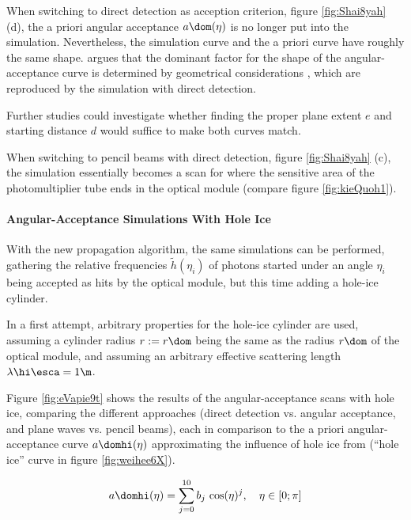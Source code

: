 
When switching to direct detection as acception criterion, figure \ref{fig:Shai8yah} (d), the a priori angular acceptance $a\dom(\eta)$ is no longer put into the simulation. Nevertheless, the simulation curve and the a priori curve have roughly the same shape.  argues that the dominant factor for the shape of the angular-acceptance curve is determined by geometrical considerations \cite{martindardupdate}, which are reproduced by the simulation with direct detection.

Further studies could investigate whether finding the proper plane extent $e$ and starting distance $d$ would suffice to make both curves match.\followup

When switching to pencil beams with direct detection, figure \ref{fig:Shai8yah} (c), the simulation essentially becomes a scan for where the sensitive area of the photomultiplier tube ends in the optical module (compare figure \ref{fig:kieQuoh1}).


\paragraph{Angular-Acceptance Simulations With Hole Ice}
With the new propagation algorithm, the same simulations can be performed, gathering the relative frequencies $\tilde{h}(\eta_i)$ of photons started under an angle $\eta_i$ being accepted as hits by the optical module, but this time adding a hole-ice cylinder.

In a first attempt, arbitrary properties for the hole-ice cylinder are used, assuming a cylinder radius $r:=r\dom$ being the same as the radius $r\dom$ of the optical module, and assuming an arbitrary effective scattering length $\lambda\hi\esca = 1\m$.


Figure \ref{fig:eVapie9t} shows the results of the angular-acceptance scans with hole ice, comparing the different approaches (direct detection vs. angular acceptance, and plane waves vs. pencil beams), each in comparison to the a priori angular-acceptance curve $a\domhi(\eta)$ approximating the influence of hole ice from \cite{icepaper} (``hole ice'' curve in figure \ref{fig:weihee6X}).

\begin{equation}
  a\domhi(\eta) = \sum_{j = 0}^{10} b_j\,\cos(\eta)^j, \ \ \ \eta \in [0; \pi]
\end{equation}

